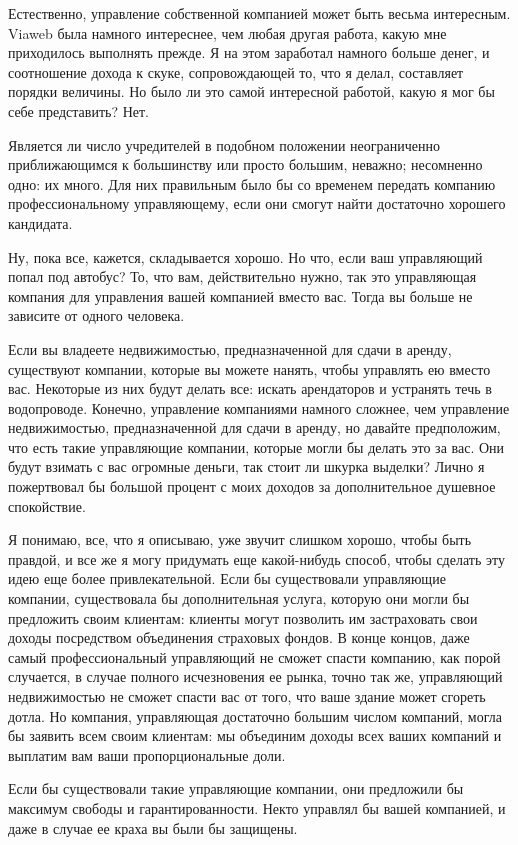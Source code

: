 \documentclass[ebook,12pt,oneside,openany]{memoir}
\begin{document}
Естественно, управление собственной компанией может быть весьма
интересным. Viaweb была намного интереснее, чем любая другая работа,
какую мне приходилось выполнять прежде. Я на этом заработал намного
больше денег, и соотношение дохода к скуке, сопровождающей то, что я
делал, составляет порядки величины. Но было ли это самой интересной
работой, какую я мог бы себе представить? Нет.

Является ли число учредителей в подобном положении неограниченно
приближающимся к большинству или просто большим, неважно; несомненно
одно: их много. Для них правильным было бы со временем передать
компанию профессиональному управляющему, если они смогут найти
достаточно хорошего кандидата.

Ну, пока все, кажется, складывается хорошо. Но что, если ваш
управляющий попал под автобус? То, что вам, действительно нужно, так
это управляющая компания для управления вашей компанией вместо вас.
Тогда вы больше не зависите от одного человека.

Если вы владеете недвижимостью, предназначенной для сдачи в аренду,
существуют компании, которые вы можете нанять, чтобы управлять ею
вместо вас. Некоторые из них будут делать все: искать арендаторов и
устранять течь в водопроводе. Конечно, управление компаниями намного
сложнее, чем управление недвижимостью, предназначенной для сдачи в
аренду, но давайте предположим, что есть такие управляющие компании,
которые могли бы делать это за вас. Они будут взимать с вас огромные
деньги, так стоит ли шкурка выделки? Лично я пожертвовал бы большой
процент с моих доходов за дополнительное душевное спокойствие.

Я понимаю, все, что я описываю, уже звучит слишком хорошо, чтобы быть
правдой, и все же я могу придумать еще какой-нибудь способ, чтобы
сделать эту идею еще более привлекательной. Если бы существовали
управляющие компании, существовала бы дополнительная услуга, которую
они могли бы предложить своим клиентам: клиенты могут позволить им
застраховать свои доходы посредством объединения страховых фондов. В
конце концов, даже самый профессиональный управляющий не сможет спасти
компанию, как порой случается, в случае полного исчезновения ее рынка,
точно так же, управляющий недвижимостью не сможет спасти вас от того,
что ваше здание может сгореть дотла. Но компания, управляющая
достаточно большим числом компаний, могла бы заявить всем своим
клиентам: мы объединим доходы всех ваших компаний и выплатим вам ваши
пропорциональные доли.

Если бы существовали такие управляющие компании, они предложили бы
максимум свободы и гарантированности. Некто управлял бы вашей
компанией, и даже в случае ее краха вы были бы защищены.
\end{document}
